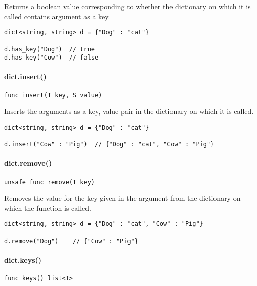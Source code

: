 Returns a boolean value corresponding to whether the dictionary on which
it is called contains argument as a key.

\begin{verbatim}
dict<string, string> d = {"Dog" : "cat"}

d.has_key("Dog")  // true
d.has_key("Cow")  // false
\end{verbatim}

\paragraph{dict.insert()}\label{dict.insert}

\begin{verbatim}
func insert(T key, S value)
\end{verbatim}

Inserts the arguments as a key, value pair in the dictionary on which it
is called.

\begin{verbatim}
dict<string, string> d = {"Dog" : "cat"}

d.insert("Cow" : "Pig")  // {"Dog" : "cat", "Cow" : "Pig"}

\end{verbatim}

\paragraph{dict.remove()}\label{dict.remove}

\begin{verbatim}
unsafe func remove(T key)
\end{verbatim}

Removes the value for the key given in the argument from the dictionary
on which the function is called.

\begin{verbatim}
dict<string, string> d = {"Dog" : "cat", "Cow" : "Pig"}

d.remove("Dog")    // {"Cow" : "Pig"}
\end{verbatim}

\paragraph{dict.keys()}\label{dict.keys}

\begin{verbatim}
func keys() list<T>
\end{verbatim}


